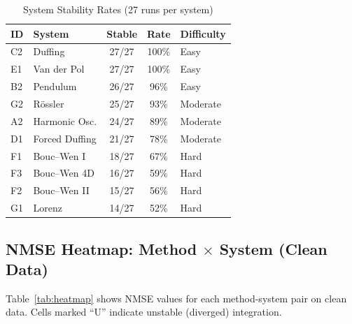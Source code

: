 \documentclass[conference]{IEEEtran}
\begin{document}
\begin{table}[!ht]
\centering
\caption{System Stability Rates (27 runs per system)}
\label{tab:system_stability}
\begin{tabular}{@{}llccl@{}}
\toprule
\textbf{ID} & \textbf{System} & \textbf{Stable} & \textbf{Rate} & \textbf{Difficulty} \\
\midrule
C2 & Duffing & 27/27 & 100\% & Easy \\
E1 & Van der Pol & 27/27 & 100\% & Easy \\
B2 & Pendulum & 26/27 & 96\% & Easy \\
G2 & R\"{o}ssler & 25/27 & 93\% & Moderate \\
A2 & Harmonic Osc. & 24/27 & 89\% & Moderate \\
D1 & Forced Duffing & 21/27 & 78\% & Moderate \\
F1 & Bouc--Wen I & 18/27 & 67\% & Hard \\
F3 & Bouc--Wen 4D & 16/27 & 59\% & Hard \\
F2 & Bouc--Wen II & 15/27 & 56\% & Hard \\
G1 & Lorenz & 14/27 & 52\% & Hard \\
\bottomrule
\end{tabular}
\end{table}

\subsection{NMSE Heatmap: Method $\times$ System (Clean Data)}

Table~\ref{tab:heatmap} shows NMSE values for each method-system pair on clean data. Cells marked ``U'' indicate unstable (diverged) integration.
\end{document}
